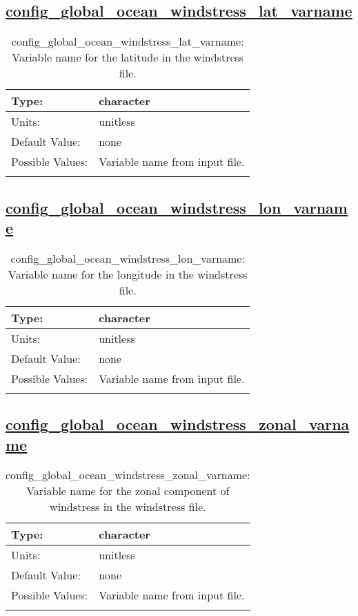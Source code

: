 \subsection[config\_global\_ocean\_windstress\_lat\_varname]{\hyperref[sec:nm_tab_global_ocean]{config\_global\_ocean\_windstress\_lat\_varname}}
\label{subsec:nm_sec_config_global_ocean_windstress_lat_varname}
\begin{center}
\begin{longtable}{| p{2.0in} || p{4.0in} |}
    \hline
    Type: & character \\
    \hline
    Units: & \si{unitless} \\
    \hline
    Default Value: & none \\
    \hline
    Possible Values: & Variable name from input file. \\
    \hline
    \caption{config\_global\_ocean\_windstress\_lat\_varname: Variable name for the latitude in the windstress file.}
\end{longtable}
\end{center}
\subsection[config\_global\_ocean\_windstress\_lon\_varname]{\hyperref[sec:nm_tab_global_ocean]{config\_global\_ocean\_windstress\_lon\_varname}}
\label{subsec:nm_sec_config_global_ocean_windstress_lon_varname}
\begin{center}
\begin{longtable}{| p{2.0in} || p{4.0in} |}
    \hline
    Type: & character \\
    \hline
    Units: & \si{unitless} \\
    \hline
    Default Value: & none \\
    \hline
    Possible Values: & Variable name from input file. \\
    \hline
    \caption{config\_global\_ocean\_windstress\_lon\_varname: Variable name for the longitude in the windstress file.}
\end{longtable}
\end{center}
\subsection[config\_global\_ocean\_windstress\_zonal\_varname]{\hyperref[sec:nm_tab_global_ocean]{config\_global\_ocean\_windstress\_zonal\_varname}}
\label{subsec:nm_sec_config_global_ocean_windstress_zonal_varname}
\begin{center}
\begin{longtable}{| p{2.0in} || p{4.0in} |}
    \hline
    Type: & character \\
    \hline
    Units: & \si{unitless} \\
    \hline
    Default Value: & none \\
    \hline
    Possible Values: & Variable name from input file. \\
    \hline
    \caption{config\_global\_ocean\_windstress\_zonal\_varname: Variable name for the zonal component of windstress in the windstress file.}
\end{longtable}
\end{center}
